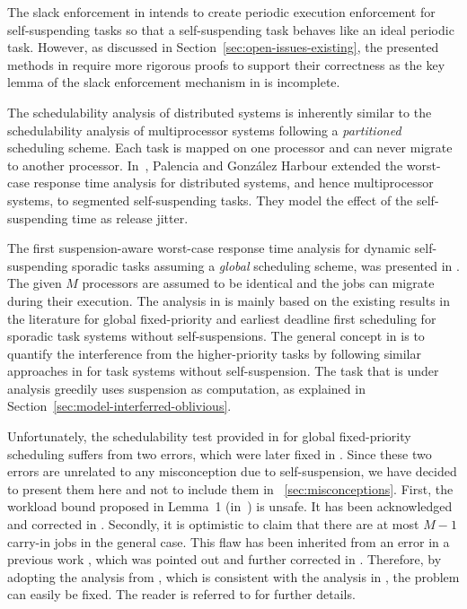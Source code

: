 \label{sec:slack-enforce}

The slack enforcement in \cite{LR:rtas10} intends to create periodic execution enforcement 
for self-suspending tasks so that a self-suspending task behaves like an ideal periodic task.  However, as discussed in 
Section~\ref{sec:open-issues-existing}, the presented methods in \cite{LR:rtas10} require more rigorous proofs to support 
their correctness as the key lemma of the slack enforcement mechanism in \cite{LR:rtas10} is incomplete.

\label{sec:multiprocessor-HRT}
  
The schedulability analysis of distributed systems is inherently similar to the schedulability analysis of multiprocessor systems following a 
\emph{partitioned} scheduling scheme. Each task is mapped on one processor and can never migrate to another processor. In~\cite{PH:rtss98}, 
Palencia and Gonz\'alez Harbour extended the worst-case response time analysis for distributed systems, and hence multiprocessor systems, to segmented self-suspending tasks. They model the effect of the self-suspending time as release jitter.
  
The first suspension-aware worst-case response time analysis for dynamic self-suspending sporadic tasks assuming a \emph{global} scheduling scheme, was presented in \cite{DBLP:conf/ecrts/LiuA13}. 
The given $M$ processors are assumed to be identical and the jobs can migrate during their execution. The analysis in \cite{DBLP:conf/ecrts/LiuA13} is mainly based on the existing results in the literature for global fixed-priority and earliest deadline first scheduling for sporadic task systems without self-suspensions. The general concept in \cite{DBLP:conf/ecrts/LiuA13} is to quantify the interference from the higher-priority tasks by following similar approaches 
in \cite{baruah2007techniques,DBLP:conf/rtss/GuanSYY09} for task systems without self-suspension. The task that is under analysis greedily uses suspension as computation, as explained in Section~\ref{sec:model-interferred-oblivious}. 

Unfortunately, the schedulability test provided in \cite{DBLP:conf/ecrts/LiuA13} for global fixed-priority scheduling suffers from two errors, which were later fixed in \cite{erratu-cong-anderson}.  Since these two errors are unrelated to any misconception due to self-suspension, we have decided to present them here and not to include them in \mysectionref{}~\ref{sec:misconceptions}.
 First, the workload bound proposed in Lemma~1 (in~\cite{DBLP:conf/ecrts/LiuA13}) is unsafe. It has been acknowledged and corrected in \cite{erratu-cong-anderson}. 
Secondly, it is optimistic to claim that there are at most $M-1$ carry-in jobs in the general case. This flaw has been inherited from an error in a 
previous work \cite{DBLP:conf/rtss/GuanSYY09}, which was pointed out and further corrected in \cite{sun2014improving,DBLP:conf/rtns/HuangC15}.  Therefore, by adopting the analysis from \cite{DBLP:conf/rtns/HuangC15}, which is consistent with the analysis in \cite{DBLP:conf/ecrts/LiuA13}, the problem can easily be fixed. The reader is referred to \cite{erratu-cong-anderson} for further details.
  
